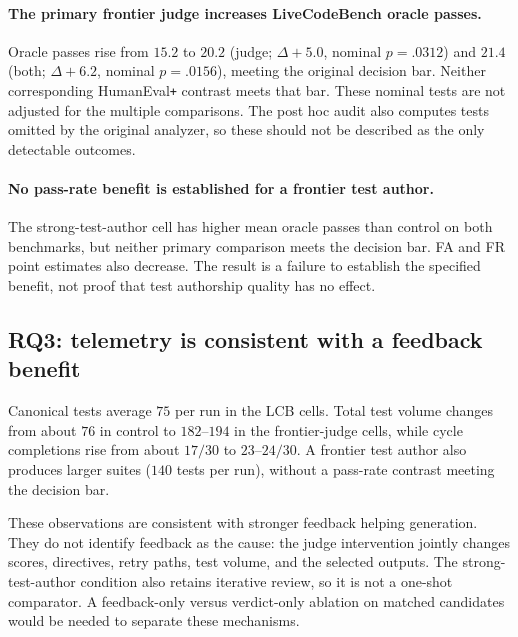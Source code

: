 \documentclass{article}
\begin{document}
\paragraph{The primary frontier judge increases LiveCodeBench oracle passes.} Oracle
passes rise from $15.2$ to $20.2$ (judge; $\Delta{+}5.0$, nominal $p{=}.0312$) and $21.4$
(both; $\Delta{+}6.2$, nominal $p{=}.0156$), meeting the original decision bar. Neither
corresponding HumanEval\texttt{+} contrast meets that bar. These nominal tests are not
adjusted for the multiple comparisons. The post hoc audit also computes tests omitted by
the original analyzer, so these should not be described as the only detectable outcomes.

\paragraph{No pass-rate benefit is established for a frontier test author.} The
strong-test-author cell has higher mean oracle passes than control on both benchmarks, but
neither primary comparison meets the decision bar. FA and FR point estimates also decrease.
The result is a failure to establish the specified benefit, not proof that test authorship
quality has no effect.

\subsection{RQ3: telemetry is consistent with a feedback benefit}
\label{sec:results-mech}

Canonical tests average $75$ per run in the LCB cells. Total test volume changes from about
$76$ in control to $182$--$194$ in the frontier-judge cells, while cycle completions rise from
about $17/30$ to $23$--$24/30$. A frontier test author also produces larger suites ($140$
tests per run), without a pass-rate contrast meeting the decision bar.

These observations are consistent with stronger feedback helping generation. They do not
identify feedback as the cause: the judge intervention jointly changes scores, directives,
retry paths, test volume, and the selected outputs. The strong-test-author condition also
retains iterative review, so it is not a one-shot comparator. A feedback-only versus
verdict-only ablation on matched candidates would be needed to separate these mechanisms.
\end{document}

